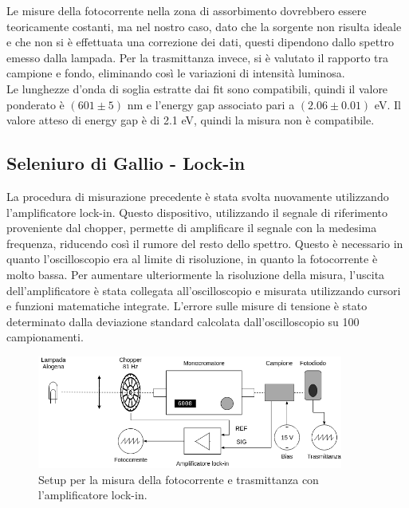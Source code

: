 \documentclass[11pt]{article} %
\begin{document}
Le misure della fotocorrente nella zona di assorbimento dovrebbero essere teoricamente costanti, ma nel nostro caso, dato che la sorgente non risulta ideale e che non si è effettuata una correzione dei dati, questi dipendono dallo spettro emesso dalla lampada. Per la trasmittanza invece, si è valutato il rapporto tra campione e fondo, eliminando così le variazioni di intensità luminosa.\\
Le lunghezze d'onda di soglia estratte dai fit sono compatibili, quindi il valore ponderato è $\left(601\pm5\right)$ nm e l'energy gap associato pari a $\left(2.06\pm0.01\right)$ eV. Il valore atteso di energy gap è di 2.1 eV, quindi la misura non è compatibile.
\subsection{Seleniuro di Gallio - Lock-in}
La procedura di misurazione precedente è stata svolta nuovamente utilizzando l'amplificatore lock-in. Questo dispositivo, utilizzando il segnale di riferimento proveniente dal chopper, permette di amplificare il segnale con la medesima frequenza, riducendo così il rumore del resto dello spettro. Questo è necessario in quanto l'oscilloscopio era al limite di risoluzione, in quanto la fotocorrente è molto bassa. Per aumentare ulteriormente la risoluzione della misura, l'uscita dell'amplificatore è stata collegata all'oscilloscopio e misurata utilizzando cursori e funzioni matematiche integrate. L'errore sulle misure di tensione è stato determinato dalla deviazione standard calcolata dall'oscilloscopio su 100 campionamenti.
\begin{figure}[h!]
\begin{center}
\includegraphics[width=380px]{img/foto_lock.png}
\caption{Setup per la misura della fotocorrente e trasmittanza con l'amplificatore lock-in.}
\end{center}
\end{figure}
\end{document}
